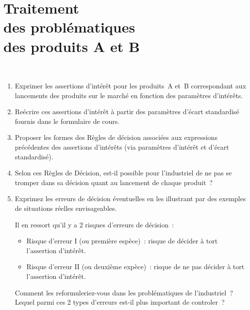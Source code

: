 \documentclass[10pt]{report}
\begin{document}
\chapter{Traitement\\ des problématiques \\des produits A et B}\label{TdProdAB}





\begin{exercice} $ $
\begin{enumerate}
\item Exprimer les assertions d'intérêt pour les produits~A et~B correspondant aux lancements des produits sur le marché en fonction des paramètres d'intérêts.
\item Reécrire ces assertions d'intérêt à partir des paramètres d'écart standardisé fournis dans le formulaire de cours.
\item Proposer les formes des Règles de décision associées aux expressions précédentes des assertions d'intérêts (via paramètres d'intérêt et d'écart standardisé).   
\item  Selon ces Règles de Décision, est-il possible pour l'industriel de ne pas se tromper dans sa décision quant au lancement de chaque produit~? 


\item Exprimez les erreurs de décision éventuelles en les illustrant par des exemples de situations réelles envisageables.


Il en ressort qu'il y a 2 risques d'erreurs de décision~: 
\begin{itemize}
\item Risque d'erreur I (ou première espèce)~: risque de décider à tort l'assertion d'intérêt.
\item Risque d'erreur II (ou deuxième expèce)~: risque de ne pas décider à tort l'assertion d'intérêt.
\end{itemize}
Comment les reformuleriez-vous dans les problématiques de l'industriel~? Lequel parmi ces 2 types d'erreurs est-il plus important de controler~?


\end{enumerate}
\end{exercice}
\end{document}

